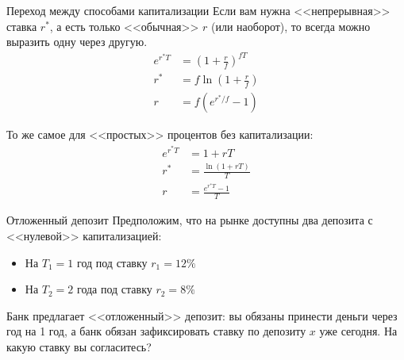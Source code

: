 \documentclass{beamer}
\begin{document}
\begin{frame}{Переход между способами капитализации}
\justify
Если вам нужна <<непрерывная>> ставка $r^*$, а есть только <<обычная>> $r$ (или наоборот), то всегда можно выразить одну через другую.
\begin{align*}
e^{r^*T} &= \left(1 + \frac{r}{f}\right)^{fT} \\
r^* &= f\ln \left(1 + \frac{r}{f}\right) \\
r &= f\left(e^{r^*/f} - 1\right)
\end{align*}

\justify
То же самое для <<простых>> процентов без капитализации:
\begin{align*}
e^{r^*T} &= 1+rT \\
r^* &= \frac{\ln(1+rT)}{T} \\
r &= \frac{e^{r^*T}-1}{T}
\end{align*}

\end{frame}



\begin{frame}{Отложенный депозит}
\justify
Предположим, что на рынке доступны два депозита с <<нулевой>> капитализацией:
\begin{itemize}
\item На $T_1=1$ год под ставку $r_1=12\%$ 
\item На $T_2=2$ года под ставку $r_2=8\%$ 
\end{itemize}

Банк предлагает <<отложенный>> депозит: вы обязаны принести деньги через год на 1 год, а банк обязан зафиксировать ставку по депозиту $x$ уже сегодня. На какую ставку вы согласитесь?

\centering
{}
\end{frame}
\end{document}
